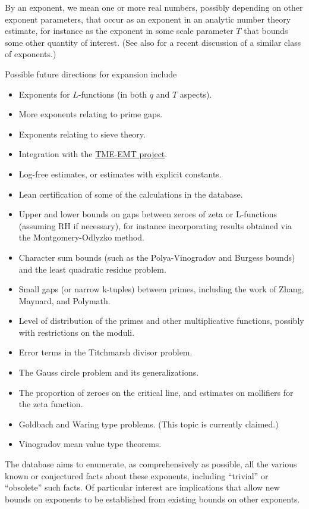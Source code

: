 By an exponent, we mean one or more real numbers, possibly depending on other exponent parameters, that occur as an exponent in an analytic number theory estimate, for instance as the exponent in some scale parameter $T$ that bounds some other quantity of interest. (See also \cite{elliott-antaaa} for a recent discussion of a similar class of exponents.)

Possible future directions for expansion include
\begin{itemize}
    \item Exponents for $L$-functions (in both $q$ and $T$ aspects).
    \item More exponents relating to prime gaps.
    \item Exponents relating to sieve theory.
    \item Integration with the \href{https://tmeemt.github.io/Chest/}{TME-EMT project}.
    \item Log-free estimates, or estimates with explicit constants.
    \item Lean certification of some of the calculations in the database.
    \item Upper and lower bounds on gaps between zeroes of zeta or L-functions (assuming RH if necessary), for instance incorporating results obtained via the Montgomery-Odlyzko method.
    \item Character sum bounds (such as the Polya-Vinogradov and Burgess bounds) and the least quadratic residue problem.
    \item Small gaps (or narrow k-tuples) between primes, including the work of Zhang, Maynard, and Polymath.
    \item Level of distribution of the primes and other multiplicative functions, possibly with restrictions on the moduli.
    \item Error terms in the Titchmarsh divisor problem.
    \item The Gauss circle problem and its generalizations.
    \item The proportion of zeroes on the critical line, and estimates on mollifiers for the zeta function.
    \item Goldbach and Waring type problems. (This topic is currently claimed.)
    \item Vinogradov mean value type theorems.
\end{itemize}

The database aims to enumerate, as comprehensively as possible, all the various known or conjectured facts about these exponents, including ``trivial'' or ``obsolete'' such facts.  Of particular interest are implications that allow new bounds on exponents to be established from existing bounds on other exponents.


